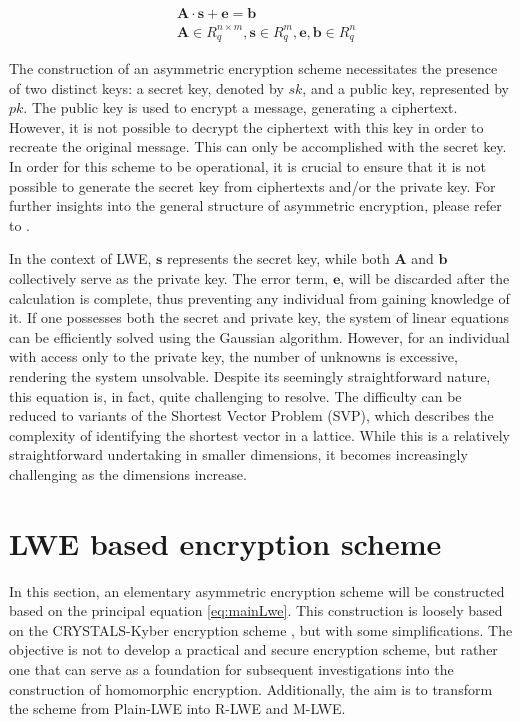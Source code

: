 \begin{equation}
  \begin{split}
     & \textbf{A}\cdot \textbf{s} + \textbf{e}= \textbf{b}                                      \\
     & \textbf{A} \in R_q^{n \times m}, \textbf{s} \in R_q^m, \textbf{e}, \textbf{b} \in R_q^n
  \end{split}
  \label{eq:mainLwe}
\end{equation}

The construction of an asymmetric encryption scheme necessitates the presence of two distinct keys: a secret key, denoted by $sk$, and a public key, represented by $pk$. The public key is used to encrypt a message, generating a ciphertext. However, it is not possible to decrypt the ciphertext with this key in order to recreate the original message. This can only be accomplished with the secret key. In order for this scheme to be operational, it is crucial to ensure that it is not possible to generate the secret key from ciphertexts and/or the private key. For further insights into the general structure of asymmetric encryption, please refer to \cite{Eckert2018}.

In the context of LWE, $\textbf{s}$ represents the secret key, while both $\textbf{A}$ and $\textbf{b}$ collectively serve as the private key. The error term, $\textbf{e}$, will be discarded after the calculation is complete, thus preventing any individual from gaining knowledge of it. If one possesses both the secret and private key, the system of linear equations can be efficiently solved using the Gaussian algorithm. However, for an individual with access only to the private key, the number of unknowns is excessive, rendering the system unsolvable. Despite its seemingly straightforward nature, this equation is, in fact, quite challenging to resolve. The difficulty can be reduced to variants of the Shortest Vector Problem (SVP), which describes the complexity of identifying the shortest vector in a lattice. While this is a relatively straightforward undertaking in smaller dimensions, it becomes increasingly challenging as the dimensions increase.

\section{LWE based encryption scheme}
\label{sec:Lwe-Encryption}

In this section, an elementary asymmetric encryption scheme will be constructed based on the principal equation \ref{eq:mainLwe}. This construction is loosely based on the CRYSTALS-Kyber encryption scheme \cite{CyrstalsKyber}, but with some simplifications. The objective is not to develop a practical and secure encryption scheme, but rather one that can serve as a foundation for subsequent investigations into the construction of homomorphic encryption. Additionally, the aim is to transform the scheme from Plain-LWE into R-LWE and M-LWE.

